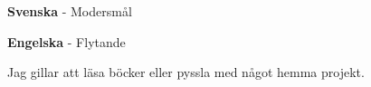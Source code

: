 \documentclass[9pt]{developercv} %
\begin{document}

\begin{minipage}[t]{0.3\textwidth}
	\vspace{-\baselineskip} %

	\textbf{Svenska} - Modersmål

	\textbf{Engelska} - Flytande
\end{minipage}
\hfill
\begin{minipage}[t]{0.3\textwidth}
	\vspace{-\baselineskip} %
	
Jag gillar att läsa böcker eller
 pyssla med något hemma projekt.
\end{minipage}
\hfill

\end{document}
